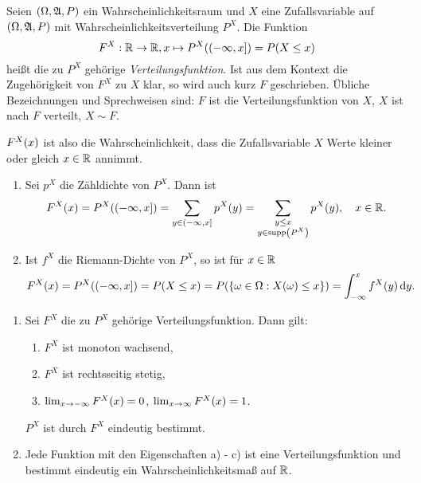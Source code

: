 \documentclass{lecture}
\begin{document}
    \begin{definition}
        Seien \(\parentheses*{\Omega, \mathfrak{A}, P}\) ein Wahrscheinlichkeitsraum und \(X\) eine Zufallsvariable auf \(\parentheses*{\Omega, \mathfrak{A}, P}\) mit Wahrscheinlichkeitsverteilung \(P^X\).
        Die Funktion
        \[
            F^X: \R \to \R, x \mapsto P^X\parentheses*{\left(-\infty, x\right]} = P\parentheses*{X \le x}
        \]
        heißt die zu \(P^X\) gehörige \emph{Verteilungsfunktion}.
        Ist aus dem Kontext die Zugehörigkeit von \(F^X\) zu \(X\) klar, so wird auch kurz \(F\) geschrieben.
        Übliche Bezeichnungen und Sprechweisen sind: \(F\) ist die Verteilungsfunktion von \(X\), \(X\) ist nach \(F\) verteilt, \(X \sim F\).
    \end{definition}

    \(F^X\parentheses*{x}\) ist also die Wahrscheinlichkeit, dass die Zufallsvariable \(X\) Werte kleiner oder gleich \(x \in \R\) annimmt.

    \begin{remark}
        \begin{enumerate}
            \item Sei \(p^X\) die Zähldichte von \(P^X\).
            Dann ist
            \[
                F^X\parentheses*{x} = P^X\parentheses*{\left(-\infty, x\right]} = \sum_{y \in \left(-\infty, x\right]}p^X\parentheses*{y} = \sum_{\substack{y \le x\\y \in \supp\parentheses*{P^X}}}p^X\parentheses*{y}, \quad x \in \R.
            \]
            \item Ist \(f^X\) die Riemann-Dichte von \(P^X\), so ist für \(x \in \R\)
            \[
                F^X\parentheses*{x} = P^X\parentheses*{\left(-\infty, x\right]} = P\parentheses*{X \le x} = P\parentheses*{\braces*{\omega \in \Omega : X\parentheses*{\omega} \le x}} = \int_{-\infty}^x f^X\parentheses*{y}\d y.
            \]
        \end{enumerate}
    \end{remark}

    \begin{lemma}
        \begin{enumerate}
            \item Sei \(F^X\) die zu \(P^X\) gehörige Verteilungsfunktion.
            Dann gilt:
            \begin{enumerate}
                \item \(F^X\) ist monoton wachsend,
                \item \(F^X\) ist rechtsseitig stetig,
                \item \(\lim_{x \to -\infty}F^X\parentheses*{x} = 0\), \(\lim_{x \to \infty}F^X\parentheses*{x} = 1\).
            \end{enumerate}
            \(P^X\) ist durch \(F^X\) eindeutig bestimmt.
            \item Jede Funktion mit den Eigenschaften a) - c) ist eine Verteilungsfunktion und bestimmt eindeutig ein Wahrscheinlichkeitsmaß auf \(\R\).
        \end{enumerate}
    \end{lemma}
\end{document}
